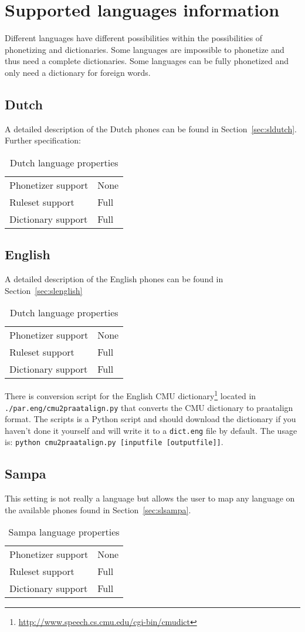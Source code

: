 \section{Supported languages information}
Different languages have different possibilities within the possibilities of
phonetizing and dictionaries. Some languages are impossible to phonetize and
thus need a complete dictionaries. Some languages can be fully phonetized and
only need a dictionary for foreign words.

\subsection{Dutch}
A detailed description of the Dutch phones can be found in
Section~\ref{sec:sldutch}. Further specification:
\begin{table}[H]
	\caption{Dutch language properties}
	\begin{tabular}{ll}
		Phonetizer support & None\\
		Ruleset support & Full\\
		Dictionary support & Full
	\end{tabular}
\end{table}

\subsection{English}
A detailed description of the English phones can be found in
Section~\ref{sec:slenglish}
\begin{table}[H]
	\caption{Dutch language properties}
	\begin{tabular}{ll}
		Phonetizer support & None\\
		Ruleset support & Full\\
		Dictionary support & Full
	\end{tabular}
\end{table}
There is conversion script for the English CMU
dictionary\footnote{\url{http://www.speech.cs.cmu.edu/cgi-bin/cmudict}} located
in \texttt{./par.eng/cmu2praatalign.py} that converts the CMU dictionary to
praatalign format. The scripts is a Python script and should download the
dictionary if you haven't done it yourself and will write it to a
\texttt{dict.eng} file by default. The usage is: \texttt{python
cmu2praatalign.py [inputfile [outputfile]]}.

\subsection{Sampa}
This setting is not really a language but allows the user to map any language
on the available phones found in Section~\ref{sec:slsampa}.
\begin{table}[H]
	\caption{Sampa language properties}
	\begin{tabular}{ll}
		Phonetizer support & None\\
		Ruleset support & Full\\
		Dictionary support & Full
	\end{tabular}
\end{table}

